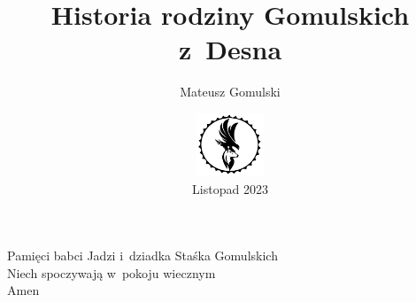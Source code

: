\documentclass[left=2.5cm, right=2.5cm, top=2.5cm, bottom=3cm, 
bindingoffset=6mm, nohyphenation=false]{Pakiety/thesis}
\title{\Huge{\textbf{Historia rodziny Gomulskich z~Desna}}}
\author{Mateusz Gomulski}
\date{\vfill \includegraphics[width=0.15\textwidth]{GML_LOGO5_black4.png} 
\large{\\Listopad 2023}}
\begin{document}


\cleardoublepage

\clearpage
\setcounter{page}{1}
\maketitle

\cleardoublepage
\begin{center}
	\thispagestyle{empty}
    \vspace*{3cm}
    \Large{Pamięci babci Jadzi i~dziadka Staśka Gomulskich \\ 
    Niech spoczywają w~pokoju wiecznym \\ Amen ~\CrossOpenShadow}
    \vfill
\end{center}

\cleardoublepage
\tableofcontents

\cleardoublepage


\cleardoublepage


\cleardoublepage


\cleardoublepage


\cleardoublepage


\cleardoublepage


\cleardoublepage

                           
\cleardoublepage
\newrefcontext[sorting=nty]
\printbibliography

\cleardoublepage




\end{document}
